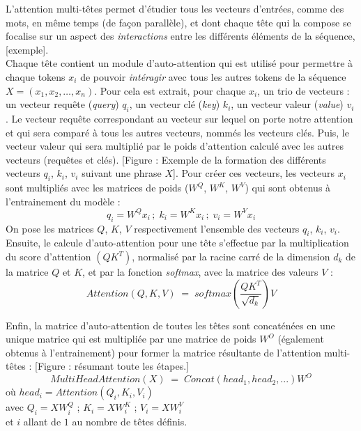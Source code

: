 \documentclass[12pt, french, twoside]{report}
\begin{document}
L'attention multi-têtes permet d'étudier tous les vecteurs d'entrées, comme des mots, en même temps (de façon parallèle), et dont chaque tête qui la compose se focalise sur un aspect des \textit{interactions} entre les différents éléments de la séquence, [exemple].\\ 

Chaque tête contient un module d'auto-attention qui est utilisé pour permettre à chaque tokens $x_i$ de pouvoir \textit{intéragir} avec tous les autres tokens de la séquence $X=(x_1, x_2, \dots, x_n)$. Pour cela est extrait, pour chaque $x_i$, un trio de vecteurs : un vecteur requête (\textit{query}) $q_i$, un vecteur clé (\textit{key}) $k_i$, un vecteur valeur (\textit{value}) $v_i$. Le vecteur requête correspondant au vecteur sur lequel on porte notre attention et qui sera comparé à tous les autres vecteurs, nommés les vecteurs clés. Puis, le vecteur valeur qui sera multiplié par le poids d'attention calculé avec les autres vecteurs (requêtes et clés). [Figure : Exemple de la formation des différents vecteurs $q_i$, $k_i$, $v_i$ suivant une phrase $X$]. Pour créer ces vecteurs, les vecteurs $x_i$ sont multipliés avec les matrices de poids ($W^Q$, $W^K$, $W^V$) qui sont obtenus à l'entrainement du modèle :
\begin{equation}
    q_i = W^Q x_i \,;\; k_i = W^K x_i \,;\; v_i = W^V x_i
\end{equation}
On pose les matrices $Q$, $K$, $V$ respectivement l'ensemble des vecteurs $q_i$, $k_i$, $v_i$.\\

Ensuite, le calcule d'auto-attention pour une tête s'effectue par la multiplication du score d'attention $(QK^T)$, normalisé par la racine carré de la dimension $d_k$ de la matrice $Q$ et $K$, et par la fonction \textit{softmax}, avec la matrice des valeurs $V$ :
\begin{equation}
    Attention(Q, K, V)\; =\; softmax(\frac{QK^T}{\sqrt{d_k}})V
\end{equation}

Enfin, la matrice d'auto-attention de toutes les têtes sont concaténées en une unique matrice qui est multipliée par une matrice de poids $W^O$ (également obtenus à l'entrainement) pour former la matrice résultante de l'attention multi-têtes : [Figure : résumant toute les étapes.]
\begin{equation}
    MultiHeadAttention(X)\;=\;Concat(head_1, head_2, ...)W^O
\end{equation}
\hfill où $head_i = Attention(Q_i, K_i, V_i)$\\
\vspace{2pt}
\hfill avec $Q_i = XW^Q_i$ ; $K_i = XW^K_i$ ; $V_i = XW^V_i$\\
\vspace{2pt}
\hfill et $i$ allant de $1$ au nombre de têtes définis.\\
\end{document}
